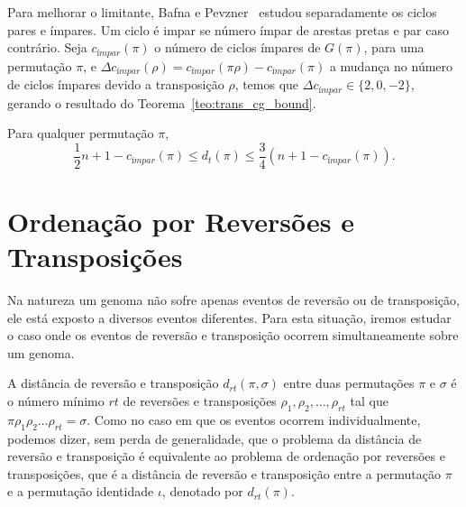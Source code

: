 Para melhorar o limitante, Bafna e Pevzner~\cite{BafnaPevzner*1998}
estudou separadamente os ciclos pares e ímpares. Um ciclo é impar se
número ímpar de arestas pretas e par caso contrário. Seja
$c_{ímpar}(\pi)$ o número de ciclos ímpares de $G(\pi)$, para uma
permutação $\pi$, e $\Delta c_{ímpar} (\rho) = c_{ímpar} (\pi \rho) -
c_{ímpar} (\pi)$ a mudança no número de ciclos ímpares devido a
transposição $\rho$, temos que $\Delta c_{ímpar} \in \{2, 0, -2\}$,
gerando o resultado do Teorema~\ref{teo:trans_cg_bound}.

\begin{teo} 
  \label{teo:trans_cg_bound} 
  Para qualquer permutação $\pi$, 
  \[ 
  \frac{1}{2}n + 1 - c_{ímpar}(\pi) \leq d_t(\pi) \leq \frac{3}{4} (n
  + 1 - c_{ímpar}(\pi)).
  \]
\end{teo}

\section{Ordenação por Reversões e Transposições}
\label{sec:rev_trans}
Na natureza um genoma não sofre apenas eventos de reversão ou de
transposição, ele está exposto a diversos eventos diferentes. Para
esta situação, iremos estudar o caso onde os eventos de reversão e
transposição ocorrem simultaneamente sobre um genoma.

A distância de reversão e transposição $d_{rt}(\pi, \sigma)$ entre
duas permutações $\pi$ e $\sigma$ é o número mínimo $rt$ de reversões
e transposições $\rho_{1}, \rho_{2}, \ldots, \rho_{rt}$ tal que
$\pi \rho_{1} \rho_{2} \ldots \rho_{rt} = \sigma$. Como no caso em que
os eventos ocorrem individualmente, podemos dizer, sem perda de
generalidade, que o problema da distância de reversão e transposição é
equivalente ao problema de ordenação por reversões e transposições,
que é a distância de reversão e transposição entre a permutação $\pi$ e a
permutação identidade $\iota$, denotado por $d_{rt}(\pi)$.

